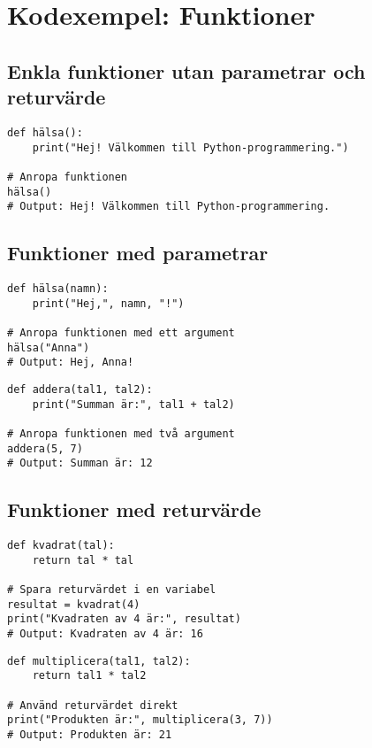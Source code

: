 \section{Kodexempel: Funktioner}
\label{examples:functions}
\subsection*{Enkla funktioner utan parametrar och returvärde}

\begin{lstlisting}[title=Exempel 1: En enkel funktion utan parametrar]
def hälsa():
    print("Hej! Välkommen till Python-programmering.")

# Anropa funktionen
hälsa()
# Output: Hej! Välkommen till Python-programmering.
\end{lstlisting}

\subsection*{Funktioner med parametrar}

\begin{lstlisting}[title=Exempel 2: Funktion med en parameter]
def hälsa(namn):
    print("Hej,", namn, "!")

# Anropa funktionen med ett argument
hälsa("Anna")
# Output: Hej, Anna!
\end{lstlisting}

\begin{lstlisting}[title=Exempel 3: Funktion med flera parametrar]
def addera(tal1, tal2):
    print("Summan är:", tal1 + tal2)

# Anropa funktionen med två argument
addera(5, 7)
# Output: Summan är: 12
\end{lstlisting}

\subsection*{Funktioner med returvärde}

\begin{lstlisting}[title=Exempel 4: Funktion som returnerar ett värde]
def kvadrat(tal):
    return tal * tal

# Spara returvärdet i en variabel
resultat = kvadrat(4)
print("Kvadraten av 4 är:", resultat)
# Output: Kvadraten av 4 är: 16
\end{lstlisting}

\begin{lstlisting}[title=Exempel 5: Funktion med både parametrar och returvärde]
def multiplicera(tal1, tal2):
    return tal1 * tal2

# Använd returvärdet direkt
print("Produkten är:", multiplicera(3, 7))
# Output: Produkten är: 21
\end{lstlisting}

